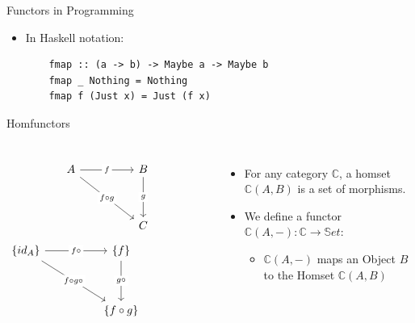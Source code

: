 \documentclass[aspectratio=169]{beamer} %
\newcommand{\bC}{\mathbb{C}}
\begin{document}
{\begin{frame}[fragile]{Functors in Programming}
\begin{itemize}
\begin{align*}
   \texttt{Maybe}\ f(a) = \begin{cases}
                           \texttt{Nothing} & \texttt{Maybe}\ a  = \texttt{Nothing}\\
                           \texttt{Just}\ f(a) & \texttt{Maybe}\ a  = \texttt{Just}\ a\\
                          \end{cases}
  \end{align*}
  \item In Haskell notation:
  \begin{verbatim}
    fmap :: (a -> b) -> Maybe a -> Maybe b
    fmap _ Nothing = Nothing
    fmap f (Just x) = Just (f x)
  \end{verbatim}

 \end{itemize}
\end{frame}
\fi
\begin{frame}[fragile]{Homfunctors}
\begin{columns}
\[\begin{tikzcd}
	A && B \\
	\\
	&& C
	\arrow["f"{description}, from=1-1, to=1-3]
	\arrow["{f \circ g}"{description}, from=1-1, to=3-3]
	\arrow["g"{description}, from=1-3, to=3-3]
\end{tikzcd}\]
\[\begin{tikzcd}
	{\{id_A\}} && {\{f\}} && {} \\
	\\
	&& {\{f \circ g\}}
	\arrow["{f \circ}"{description}, from=1-1, to=1-3]
	\arrow["{f \circ g \circ}"{description}, from=1-1, to=3-3]
	\arrow["{g \circ}"{description}, from=1-3, to=3-3]
\end{tikzcd}\]
 \begin{itemize}
  \item For any category $\bC$, a homset $\bC(A,B)$ is a set of morphisms.
  \item We define a functor $\bC(A, -) : \bC \to \mathbb{S}et$:
  \begin{itemize}
    \item $\bC(A, -)$ maps an Object $B$ to the Homset $\bC(A,B)$

\end{itemize}
\end{itemize}
\end{columns}
\end{frame}}
\end{document}
